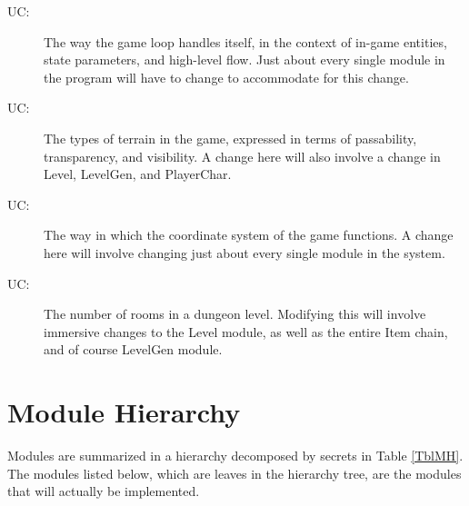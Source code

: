 \documentclass[12pt, titlepage]{article}
\newcommand{\newSection}[1]{
  \newpage
  \section{#1}
}
\newcounter{ucnum}
\newcommand{\uctheucnum}{UC\theucnum}
\begin{document}
        \bigskip\begin{description}
            \item[ \uctheucnum \label{ucMasterCtrl}:] The way the game loop handles itself, in the context of in-game entities, state parameters, and high-level flow. Just about every single module in the program will have to change to accommodate for this change.
            \item[ \uctheucnum \label{ucTerrain}:] The types of terrain in the game, expressed in terms of passability, transparency, and visibility. A change here will also involve a change in Level, LevelGen, and PlayerChar.
            \item[ \uctheucnum \label{ucCoord}:] The way in which the coordinate system of the game functions. A change here will involve changing just about every single module in the system.
            \item[ \uctheucnum \label{ucRooms}:] The number of rooms in a dungeon level. Modifying this will involve immersive changes to the Level module, as well as the entire Item chain, and of course LevelGen module.
        \end{description}

\newSection{Module Hierarchy} \label{SecMH}

    Modules are summarized in a hierarchy decomposed by secrets in Table \ref{TblMH}. The modules listed below, which are leaves in the hierarchy tree, are the modules that will actually be implemented.
\end{document}
